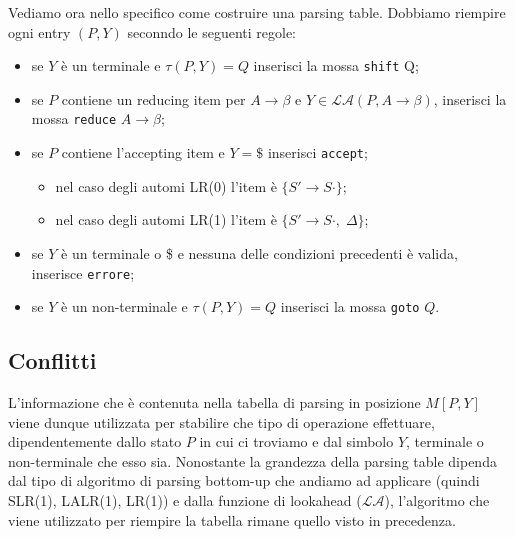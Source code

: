 \documentclass[class=book, crop=false, oneside, 12pt]{standalone}
\begin{document}
Vediamo ora nello specifico come costruire una parsing table. Dobbiamo riempire ogni entry \((P, Y)\) seconndo le seguenti regole:
\begin{itemize}
    \item se \(Y\) è un terminale e \(\tau (P,Y) = Q\) inserisci la mossa \texttt{shift} Q;
    \item se \(P\) contiene un reducing item per \(A \to \beta\) e \(Y \in \mathcal{LA}(P, A \to \beta)\), inserisci la mossa \texttt{reduce} \(A \to \beta\);
    \item se \(P\) contiene l'accepting item e \(Y=\$\) inserisci \texttt{accept};
        \begin{itemize}
            \item nel caso degli automi LR(0) l'item è \(\{S' \to S \cdot\}\);
            \item nel caso degli automi LR(1) l'item è \(\{S' \to S \cdot, \; \Delta\}\);
        \end{itemize}
\item se \(Y\) è un terminale o \$ e nessuna delle condizioni precedenti è valida, inserisce \texttt{errore};
    \item se \(Y\) è un non-terminale e \(\tau (P, Y) = Q\) inserisci la mossa \texttt{goto} \(Q\).
\end{itemize}

\subsection{Conflitti}
L'informazione che è contenuta nella tabella di parsing in posizione \(M[P, Y]\) viene dunque utilizzata per stabilire che tipo di operazione effettuare, dipendentemente dallo stato \(P\) in cui ci troviamo e dal simbolo \(Y\), terminale o non-terminale che esso sia.
Nonostante la grandezza della parsing table dipenda dal tipo di algoritmo di parsing bottom-up che andiamo ad applicare (quindi SLR(1), LALR(1), LR(1)) e dalla funzione di lookahead (\(\mathcal{LA}\)), l'algoritmo che viene utilizzato per riempire la tabella rimane quello visto in precedenza.
\end{document}
